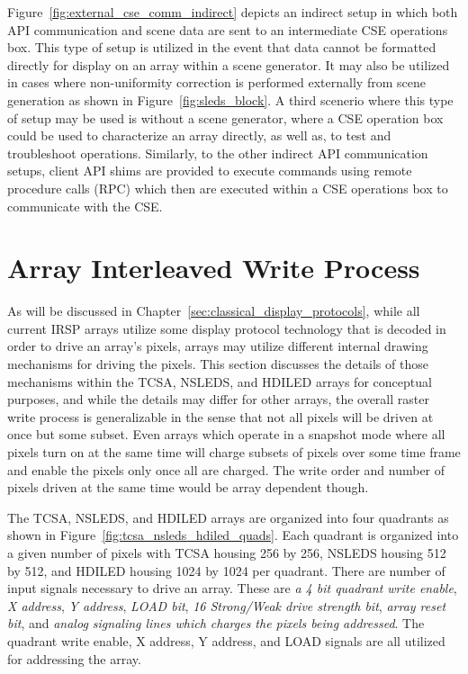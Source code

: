     Figure~\ref{fig:external_cse_comm_indirect} depicts an indirect setup in which both API communication and scene data are sent to an intermediate CSE operations box. This type of setup is utilized in the event that data cannot be formatted directly for display on an array within a scene generator. It may also be utilized in cases where non-uniformity correction is performed externally from scene generation as shown in Figure~\ref{fig:sleds_block}. A third scenerio where this type of setup may be used is without a scene generator, where a CSE operation box could be used to characterize an array directly, as well as, to test and troubleshoot operations. Similarly, to the other indirect API communication setups, client API shims are provided to execute commands using remote procedure calls (RPC) which then are executed within a CSE operations box to communicate with the CSE.

\section{Array Interleaved Write Process}
    \label{sec:array_Interleaved_write_process}
    As will be discussed in Chapter~\ref{sec:classical_display_protocols}, while all current IRSP arrays utilize some display protocol technology that is decoded in order to drive an array's pixels, arrays may utilize different internal drawing mechanisms for driving the pixels. This section discusses the details of those mechanisms within the TCSA, NSLEDS, and HDILED arrays for conceptual purposes, and while the details may differ for other arrays, the overall raster write process is generalizable in the sense that not all pixels will be driven at once but some subset. Even arrays which operate in a snapshot mode where all pixels turn on at the same time will charge subsets of pixels over some time frame and enable the pixels only once all are charged. The write order and number of pixels driven at the same time would be array dependent though.

    The TCSA, NSLEDS, and HDILED arrays are organized into four quadrants as shown in Figure~\ref{fig:tcsa_nsleds_hdiled_quads}. Each quadrant is organized into a given number of pixels with TCSA housing 256 by 256, NSLEDS housing 512 by 512, and HDILED housing 1024 by 1024 per quadrant. There are number of input signals necessary to drive an array. These are {\em a 4 bit quadrant write enable}, {\em X address}, {\em Y address}, {\em LOAD bit}, {\em 16 Strong/Weak drive strength bit}, {\em array reset bit}, and {\em analog signaling lines which charges the pixels being addressed}. The quadrant write enable, X address, Y address, and LOAD signals are all utilized for addressing the array.

